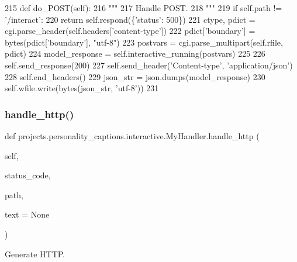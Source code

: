 \begin{DoxyCode}
215     \textcolor{keyword}{def }do\_POST(self):
216         \textcolor{stringliteral}{"""}
217 \textcolor{stringliteral}{        Handle POST.}
218 \textcolor{stringliteral}{        """}
219         \textcolor{keywordflow}{if} self.path != \textcolor{stringliteral}{'/interact'}:
220             \textcolor{keywordflow}{return} self.respond(\{\textcolor{stringliteral}{'status'}: 500\})
221         ctype, pdict = cgi.parse\_header(self.headers[\textcolor{stringliteral}{'content-type'}])
222         pdict[\textcolor{stringliteral}{'boundary'}] = bytes(pdict[\textcolor{stringliteral}{'boundary'}], \textcolor{stringliteral}{"utf-8"})
223         postvars = cgi.parse\_multipart(self.rfile, pdict)
224         model\_response = self.interactive\_running(postvars)
225 
226         self.send\_response(200)
227         self.send\_header(\textcolor{stringliteral}{'Content-type'}, \textcolor{stringliteral}{'application/json'})
228         self.end\_headers()
229         json\_str = json.dumps(model\_response)
230         self.wfile.write(bytes(json\_str, \textcolor{stringliteral}{'utf-8'}))
231 
\end{DoxyCode}
\mbox{\label{classprojects_1_1personality__captions_1_1interactive_1_1MyHandler_aa0900ea1f19ecd9cd9bf0ae93ce1028e}} 
\subsubsection{\texorpdfstring{handle\+\_\+http()}{handle\_http()}}
{\footnotesize\ttfamily def projects.\+personality\+\_\+captions.\+interactive.\+My\+Handler.\+handle\+\_\+http (\begin{DoxyParamCaption}\item[{}]{self,  }\item[{}]{status\+\_\+code,  }\item[{}]{path,  }\item[{}]{text = {\ttfamily None} }\end{DoxyParamCaption})}

\begin{DoxyVerb}Generate HTTP.
\end{DoxyVerb}
 

